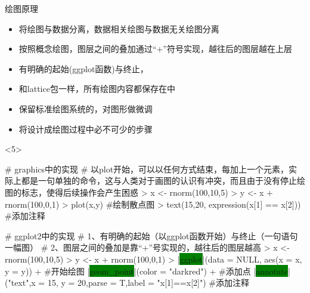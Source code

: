 \begin{frame}[t,fragile]{\subsecname}{绘图原理}
\begin{itemize}
\item<1-> 将绘图与数据分离，数据相关绘图与数据无关绘图分离
\item<2-> 按照概念绘图，图层之间的叠加通过“+”符号实现，越往后的图层越在上层
\item<2-> 有明确的起始(ggplot函数)与终止，
\item<3-> 和lattice包一样，所有绘图内容都保存在中
\item<4-> 保留标准绘图系统的，对图形做微调
\item<4-> 将设计成绘图过程中必不可少的步骤
\end{itemize}

\begin{overlayarea}{\textwidth}{\textheight}
\begin{onlyenv}<5>
\begin{minipage}{\textwidth}
\begin{rcode}
# graphics中的实现
# 以plot开始，可以以任何方式结束，每加上一个元素，实际上都是一句单独的命令，这与人类对于画图的认识有冲突，而且由于没有停止绘图的标志，使得后续操作会产生困惑
> x <- rnorm(100,10,5)
> y <- x + rnorm(100,0,1)
> plot(x,y)   #绘制散点图
> text(15,20, expression(x[1] == x[2])) #添加注释
\end{rcode} 
\end{minipage}

\begin{minipage}{\textwidth}
\begin{rcode}
# ggplot2中的实现
# 1、有明确的起始（以ggplot函数开始）与终止（一句语句一幅图）
# 2、图层之间的叠加是靠“+”号实现的，越往后的图层越高
> x <- rnorm(100,10,5) 
> y <- x + rnorm(100,0,1) 
> |\colorbox{green}{ggplot}|(data = NULL, aes(x = x, y = y)) +  #开始绘图
  |\colorbox{green}{geom\_point}|(color = "darkred") +  #添加点
  |\colorbox{green}{annotate}|("text",x = 15, y = 20,parse = T,label = "x[1]==x[2]") #添加注释
\end{rcode}
\end{minipage}
\end{onlyenv}
\end{overlayarea}
\end{frame}

